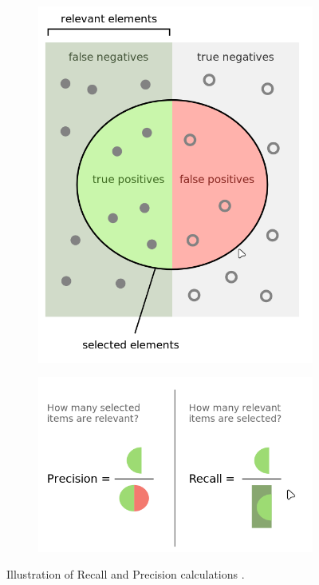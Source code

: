         \begin{figure}[H]
            \centering
            \captionsetup{justification=centering}
            \begin{subfigure}{0.3\textwidth}
                \includegraphics[width=\textwidth]{Sections/5ImageClef/images/f1_1.png}
                \end{subfigure}
                \begin{subfigure}{0.4\textwidth}
                \includegraphics[width=\textwidth]{Sections/5ImageClef/images/f1_2.png}
                \end{subfigure}

            \caption[Illustration of Recall and Precision calculation]{Illustration of Recall and Precision calculations \cite{Wikipedia2020}.}   
         
            \label{fig:example_f1}
        \end{figure}
        
